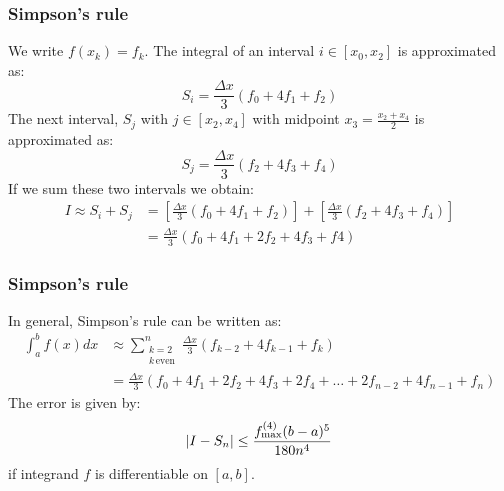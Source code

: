 \documentclass[11pt,table,final,fleqn,xcolor={usenames,dvipsnames,table}]{beamer}
\begin{document}
\begin{frame}
  \frametitle{Simpson's rule}
  We write $f(x_k) = f_k$. The integral of an interval $i\in[x_0,x_2]$ is approximated as:
  \[
    S_i = \frac{\Delta x}{3}\left( f_0 + 4f_1 + f_2\right)
  \]
  \pause
  The next interval, $S_{j}$ with $j\in[x_2,x_4]$ with midpoint $x_3=\frac{x_2+x_4}{2}$ is approximated as:
  \[
    S_j = \frac{\Delta x}{3}\left( f_2 + 4f_3 + f_4\right)
  \]
  \pause
  If we sum these two intervals we obtain:
  \begin{align*}
    I \approx S_i + S_j &= \left[\frac{\Delta x}{3}\left( f_0 + 4f_1 + f_2\right)\right] +  \left[\frac{\Delta x}{3}\left( f_2 + 4f_3 + f_4\right)\right] \\
    &= \frac{\Delta x}{3}\left(f_0 + 4f_1+2f_2 +4f_3 + f4 \right)
  \end{align*}
\end{frame}
\begin{frame}
  \frametitle{Simpson's rule}
  In general, Simpson's rule can be written as:
  \begin{align*}
    \int_a^b f(x)dx &\approx \sum^n_{\begin{matrix}
                             k=2\\
                             k\, \text{even}
                           \end{matrix}} \frac{\Delta x}{3}\left( f_{k-2} + 4f_{k-1} + f_k\right) \\
                           &= \frac{\Delta x}{3}\left(f_0 + 4f_1 +2f_2+4f_3+2f_4+\ldots+2f_{n-2}+4f_{n-1}+f_n \right)
  \end{align*}
  \pause
  The error is given by:
  \[
    \abs{I-S_n} \leq \frac{f^{(4)}_\text{max}(b-a)^5}{180n^4}
  \]
  if integrand $f$ is differentiable on $[a,b]$.
\end{frame}
\end{document}
